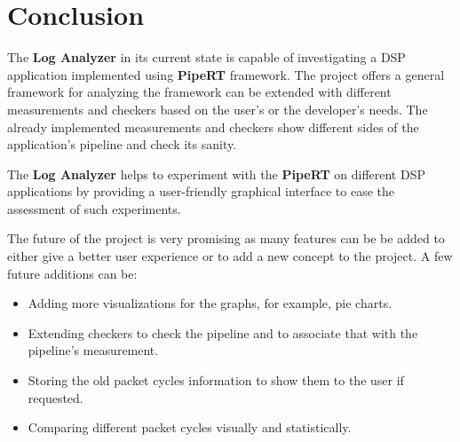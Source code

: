 \chapter{Conclusion} %
\label{ch:sum}
The \textbf{Log Analyzer} in its current state is capable of investigating a DSP application implemented
using \textbf{PipeRT} framework. The project offers a general framework for analyzing the framework
can be extended with different measurements and checkers based on the user's or the developer's needs.
The already implemented measurements and checkers show different sides of the application's pipeline
and check its sanity.

The \textbf{Log Analyzer} helps to experiment with the \textbf{PipeRT} on different DSP applications
by providing a user-friendly graphical interface to ease the assessment of such experiments.

The future of the project is very promising as many features can be be added to either
give a better user experience or to add a new concept to the project. A few future additions can be:
\begin{itemize}
    \item Adding more visualizations for the graphs, for example, pie charts.
    \item Extending checkers to check the pipeline and to associate that with the pipeline's measurement.
    \item Storing the old packet cycles information to show them to the user if requested.
    \item Comparing different packet cycles visually and statistically.
\end{itemize}